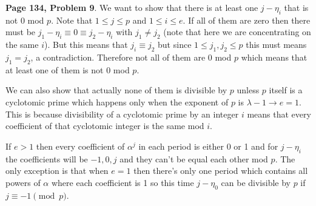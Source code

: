 \documentclass[aps,preprint,preprintnumbers,nofootinbib,showpacs,prd]{revtex4-1}
\begin{document}
{\bf Page 134, Problem 9}. We want to show that there is at least one $j - \eta_i$ that is not $0$ mod $p$. Note that $1 \le j \le p$ and $1 \le i \le e$. If all of them are zero then there must be $j_1 - \eta_i \equiv 0 \equiv j_2 - \eta_i$ with $j_1 \neq j_2$ (note that here we are concentrating on the same $i$). But this means that $j_i \equiv j_2$ but since $1 \le j_1, j_2 \le p$ this must means $j_1 = j_2$, a contradiction. Therefore not all of them are 0 mod $p$ which means that at least one of them is not 0 mod $p$.

We can also show that actually none of them is divisible by $p$ unless $p$ itself is a cyclotomic prime which happens only when the exponent of $p$ is $\lambda - 1 \to e = 1$. This is because divisibility of a cyclotomic prime by an integer $i$ means that every coefficient of that cyclotomic integer is the same mod $i$. 

If $e > 1$ then every coefficient of $\alpha^j$ in each period is either 0 or 1 and for $j - \eta_i$ the coefficients will be $-1,0, j$ and they can't be equal each other mod $p$. The only exception is that when $e = 1$ then there's only one period which contains all powers of $\alpha$ where each coefficient is 1 so this time $j -\eta_0$ can be divisible by $p$ if $j \equiv -1 \pmod{p}$. 
\end{document}

